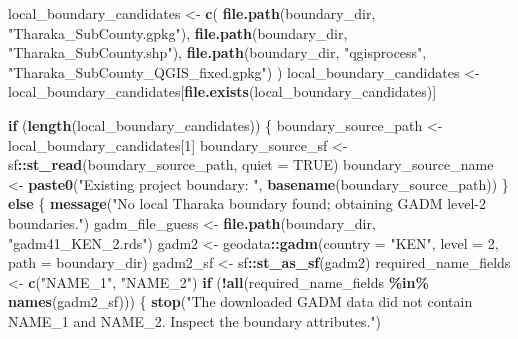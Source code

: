 \documentclass[
]{article}
\newenvironment{Shaded}{\begin{snugshade}}{\end{snugshade}}
\newcommand{\AttributeTok}[1]{\textcolor[rgb]{0.13,0.29,0.53}{#1}}
\newcommand{\ConstantTok}[1]{\textcolor[rgb]{0.56,0.35,0.01}{#1}}
\newcommand{\ControlFlowTok}[1]{\textcolor[rgb]{0.13,0.29,0.53}{\textbf{#1}}}
\newcommand{\DecValTok}[1]{\textcolor[rgb]{0.00,0.00,0.81}{#1}}
\newcommand{\FunctionTok}[1]{\textcolor[rgb]{0.13,0.29,0.53}{\textbf{#1}}}
\newcommand{\NormalTok}[1]{#1}
\newcommand{\OtherTok}[1]{\textcolor[rgb]{0.56,0.35,0.01}{#1}}
\newcommand{\SpecialCharTok}[1]{\textcolor[rgb]{0.81,0.36,0.00}{\textbf{#1}}}
\newcommand{\StringTok}[1]{\textcolor[rgb]{0.31,0.60,0.02}{#1}}
\begin{document}
\begin{Shaded}
\begin{Highlighting}[]
\NormalTok{local\_boundary\_candidates }\OtherTok{\textless{}{-}} \FunctionTok{c}\NormalTok{(}
  \FunctionTok{file.path}\NormalTok{(boundary\_dir, }\StringTok{"Tharaka\_SubCounty.gpkg"}\NormalTok{),}
  \FunctionTok{file.path}\NormalTok{(boundary\_dir, }\StringTok{"Tharaka\_SubCounty.shp"}\NormalTok{),}
  \FunctionTok{file.path}\NormalTok{(boundary\_dir, }\StringTok{"qgisprocess"}\NormalTok{, }\StringTok{"Tharaka\_SubCounty\_QGIS\_fixed.gpkg"}\NormalTok{)}
\NormalTok{)}
\NormalTok{local\_boundary\_candidates }\OtherTok{\textless{}{-}}\NormalTok{ local\_boundary\_candidates[}\FunctionTok{file.exists}\NormalTok{(local\_boundary\_candidates)]}

\ControlFlowTok{if}\NormalTok{ (}\FunctionTok{length}\NormalTok{(local\_boundary\_candidates)) \{}
\NormalTok{  boundary\_source\_path }\OtherTok{\textless{}{-}}\NormalTok{ local\_boundary\_candidates[}\DecValTok{1}\NormalTok{]}
\NormalTok{  boundary\_source\_sf }\OtherTok{\textless{}{-}}\NormalTok{ sf}\SpecialCharTok{::}\FunctionTok{st\_read}\NormalTok{(boundary\_source\_path, }\AttributeTok{quiet =} \ConstantTok{TRUE}\NormalTok{)}
\NormalTok{  boundary\_source\_name }\OtherTok{\textless{}{-}} \FunctionTok{paste0}\NormalTok{(}\StringTok{"Existing project boundary: "}\NormalTok{, }\FunctionTok{basename}\NormalTok{(boundary\_source\_path))}
\NormalTok{\} }\ControlFlowTok{else}\NormalTok{ \{}
  \FunctionTok{message}\NormalTok{(}\StringTok{"No local Tharaka boundary found; obtaining GADM level{-}2 boundaries."}\NormalTok{)}
\NormalTok{  gadm\_file\_guess }\OtherTok{\textless{}{-}} \FunctionTok{file.path}\NormalTok{(boundary\_dir, }\StringTok{"gadm41\_KEN\_2.rds"}\NormalTok{)}
\NormalTok{  gadm2 }\OtherTok{\textless{}{-}}\NormalTok{ geodata}\SpecialCharTok{::}\FunctionTok{gadm}\NormalTok{(}\AttributeTok{country =} \StringTok{"KEN"}\NormalTok{, }\AttributeTok{level =} \DecValTok{2}\NormalTok{, }\AttributeTok{path =}\NormalTok{ boundary\_dir)}
\NormalTok{  gadm2\_sf }\OtherTok{\textless{}{-}}\NormalTok{ sf}\SpecialCharTok{::}\FunctionTok{st\_as\_sf}\NormalTok{(gadm2)}
\NormalTok{  required\_name\_fields }\OtherTok{\textless{}{-}} \FunctionTok{c}\NormalTok{(}\StringTok{"NAME\_1"}\NormalTok{, }\StringTok{"NAME\_2"}\NormalTok{)}
  \ControlFlowTok{if}\NormalTok{ (}\SpecialCharTok{!}\FunctionTok{all}\NormalTok{(required\_name\_fields }\SpecialCharTok{\%in\%} \FunctionTok{names}\NormalTok{(gadm2\_sf))) \{}
    \FunctionTok{stop}\NormalTok{(}\StringTok{"The downloaded GADM data did not contain NAME\_1 and NAME\_2. Inspect the boundary attributes."}\NormalTok{)}

\end{Highlighting}
\end{Shaded}
\end{document}
